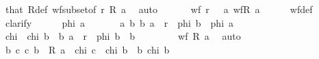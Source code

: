 \begin{isabellebody}
\ that\ R{\isacharunderscore}{\kern0pt}def\ wf{\isacharunderscore}{\kern0pt}subset{\isacharbrackleft}{\kern0pt}of\ r\ {\isachardoublequoteopen}R\ a{\isachardoublequoteclose}{\isacharbrackright}{\kern0pt}\ \isamarkupfalse%
\ auto\isanewline
\ \ \isamarkupfalse%
\isanewline
\ \ \isamarkupfalse%
\ {\isachardoublequoteopen}wf\ r{\isachardoublequoteclose}\ \ {\isacharasterisk}{\kern0pt}{\isacharcolon}{\kern0pt}\ {\isachardoublequoteopen}{\isasymforall}a{\isachardot}{\kern0pt}\ wf{\isacharparenleft}{\kern0pt}R\ a{\isacharparenright}{\kern0pt}{\isachardoublequoteclose}\isanewline
\ \ \ \ \isamarkupfalse%
\ wf{\isacharunderscore}{\kern0pt}def\isanewline
\ \ \isamarkupfalse%
\ clarify\isanewline
\ \ \ \ \isamarkupfalse%
\ phi\ a\isanewline
\ \ \ \ \isamarkupfalse%
\ {\isacharasterisk}{\kern0pt}{\isacharasterisk}{\kern0pt}{\isacharcolon}{\kern0pt}\ {\isachardoublequoteopen}{\isasymforall}a{\isachardot}{\kern0pt}\ {\isacharparenleft}{\kern0pt}{\isasymforall}b{\isachardot}{\kern0pt}\ {\isacharparenleft}{\kern0pt}b{\isacharcomma}{\kern0pt}\ a{\isacharparenright}{\kern0pt}\ {\isasymin}\ r\ {\isasymlongrightarrow}\ phi\ b{\isacharparenright}{\kern0pt}\ {\isasymlongrightarrow}\ phi\ a{\isachardoublequoteclose}\isanewline
\ \ \ \ \isamarkupfalse%
\ chi\ \ {\isachardoublequoteopen}chi\ b\ {\isasymlongleftrightarrow}\ {\isacharparenleft}{\kern0pt}b{\isacharcomma}{\kern0pt}\ a{\isacharparenright}{\kern0pt}\ {\isasymin}\ r\ {\isasymlongrightarrow}\ phi\ b{\isachardoublequoteclose}\ \ b\isanewline
\ \ \ \ \isamarkupfalse%
\ {\isacharasterisk}{\kern0pt}\ \isamarkupfalse%
\ {\isachardoublequoteopen}wf\ {\isacharparenleft}{\kern0pt}R\ a{\isacharparenright}{\kern0pt}{\isachardoublequoteclose}\ \isamarkupfalse%
\ auto\isanewline
\ \ \ \ \isamarkupfalse%
\ \isamarkupfalse%
\ {\isachardoublequoteopen}{\isacharparenleft}{\kern0pt}{\isasymforall}b{\isachardot}{\kern0pt}\ {\isacharparenleft}{\kern0pt}{\isasymforall}c{\isachardot}{\kern0pt}\ {\isacharparenleft}{\kern0pt}c{\isacharcomma}{\kern0pt}\ b{\isacharparenright}{\kern0pt}\ {\isasymin}\ R\ a\ {\isasymlongrightarrow}\ chi\ c{\isacharparenright}{\kern0pt}\ {\isasymlongrightarrow}\ chi\ b{\isacharparenright}{\kern0pt}\ {\isasymlongrightarrow}\ {\isacharparenleft}{\kern0pt}{\isasymforall}b{\isachardot}{\kern0pt}\ chi\ b{\isacharparenright}{\kern0pt}{\isachardoublequoteclose}\isanewline

\end{isabellebody}
